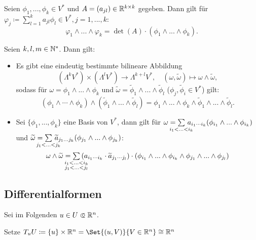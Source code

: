 \documentclass{cheat-sheet}
\begin{document}
\begin{samepage}

\begin{prop}
  Seien $\phi_1, ..., \phi_k \in V^*$ und $A = (a_{jl}) \in \mathbb{R}^{k \times k}$ gegeben.
  Dann gilt für $\varphi_j \coloneqq \sum_{l=1}^k a_{jl} \phi_l \in V^*, j = 1, ..., k$:
  \[ \varphi_1 \wedge ... \wedge \varphi_k = \det(A) \cdot (\phi_1 \wedge ... \wedge \phi_k). \]
\end{prop}

\begin{satz}
  Seien $k, l, m \in \mathbb{N}^*$. Dann gilt:
  \begin{itemize}
    \item Es gibt eine eindeutig bestimmte bilineare Abbildung
    \[ (\Lambda^k V^*) \times (\Lambda^l V^*) \to \Lambda^{k+l} V^*, \quad (\omega, \widetilde{\omega}) \mapsto \omega \wedge \widetilde{\omega}, \]
    sodass für $\omega = \phi_1 \wedge ... \wedge \phi_k$ und $\widetilde{\omega} = \widetilde{\phi}_1 \wedge ... \wedge \widetilde{\phi}_l$ ($\phi_j, \widetilde{\phi}_i \in V^*$) gilt:
    \[ (\phi_1 \wedge \cdots \wedge \phi_k) \wedge (\widetilde{\phi}_1 \wedge ... \wedge \widetilde{\phi}_l) = \phi_1 \wedge ... \wedge \phi_k \wedge \widetilde{\phi}_1 \wedge ... \wedge \widetilde{\phi}_l. \]
    \item Sei $\{ \phi_1 , ..., \phi_k \}$ eine Basis von $V^*$, dann gilt für $\omega = \sum_{\mathclap{i_1 < ... < i_k}} \, a_{i_1 \cdots i_k} (\phi_{i_1} \wedge ... \wedge \phi_{i_k})$ und $\widetilde{\omega} = \sum_{\mathclap{j_1 < ... < j_k}} \, \widetilde{a}_{j_1 ... j_k} (\phi_{j_1} \wedge ... \wedge \phi_{j_k})$:
    \[ \omega \wedge \widetilde{\omega} = \sum_{\mathclap{\substack{i_1 < ... < i_k \\ j_1 < ... < j_l}}} \, (a_{i_1 \cdots i_k} \cdot \widetilde{a}_{j_1 \cdots j_l}) \cdot (\phi_{i_1} \wedge ... \wedge \phi_{i_k} \wedge \phi_{j_1} \wedge ... \wedge \phi_{j_l}) \]
  \end{itemize}
\end{satz}


\subsection{Differentialformen}

\end{samepage}


\begin{nota}
  Sei im Folgenden $u \in U \opn \R^n$.

  Setze $T_u U \coloneqq \{ u \} \times \R^n = \Set{ (u, V) }{ V \in \R^n } \cong \R^n$
\end{nota}
\end{document}
